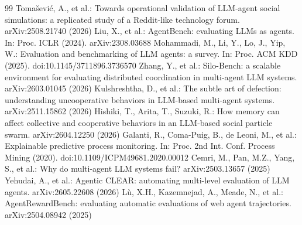 \documentclass[runningheads]{llncs}
\begin{document}
\begin{thebibliography}{99}
Toma\v{s}evi\'c, A., et al.: Towards operational validation of LLM-agent social simulations: a replicated study of a Reddit-like technology forum. arXiv:2508.21740 (2026)
Liu, X., et al.: AgentBench: evaluating LLMs as agents. In: Proc. ICLR (2024). arXiv:2308.03688
Mohammadi, M., Li, Y., Lo, J., Yip, W.: Evaluation and benchmarking of LLM agents: a survey. In: Proc. ACM KDD (2025). doi:10.1145/3711896.3736570
Zhang, Y., et al.: Silo-Bench: a scalable environment for evaluating distributed coordination in multi-agent LLM systems. arXiv:2603.01045 (2026)
Kulshreshtha, D., et al.: The subtle art of defection: understanding uncooperative behaviors in LLM-based multi-agent systems. arXiv:2511.15862 (2026)
Hishiki, T., Arita, T., Suzuki, R.: How memory can affect collective and cooperative behaviors in an LLM-based social particle swarm. arXiv:2604.12250 (2026)
Galanti, R., Coma-Puig, B., de Leoni, M., et al.: Explainable predictive process monitoring. In: Proc. 2nd Int. Conf. Process Mining (2020). doi:10.1109/ICPM49681.2020.00012
Cemri, M., Pan, M.Z., Yang, S., et al.: Why do multi-agent LLM systems fail? arXiv:2503.13657 (2025)
Yehudai, A., et al.: Agentic CLEAR: automating multi-level evaluation of LLM agents. arXiv:2605.22608 (2026)
L\`u, X.H., Kazemnejad, A., Meade, N., et al.: AgentRewardBench: evaluating automatic evaluations of web agent trajectories. arXiv:2504.08942 (2025)
\end{thebibliography}
\end{document}
